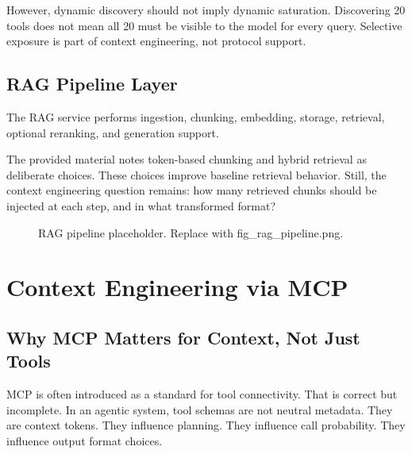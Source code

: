 \documentclass[conference]{IEEEtran}
\begin{document}
However, dynamic discovery should not imply dynamic saturation.
Discovering 20 tools does not mean all 20 must be visible to the model for every query.
Selective exposure is part of context engineering, not protocol support.

\subsection{RAG Pipeline Layer}

The RAG service performs ingestion,
chunking,
embedding,
storage,
retrieval,
optional reranking,
and generation support.

The provided material notes token-based chunking and hybrid retrieval as deliberate choices.
These choices improve baseline retrieval behavior.
Still, the context engineering question remains:
how many retrieved chunks should be injected at each step,
and in what transformed format?

\begin{figure}[H]
\centering
{}
\caption{RAG pipeline placeholder. Replace with fig\_rag\_pipeline.png.}
\label{fig:rag_pipeline}
\end{figure}

\section{Context Engineering via MCP}
\label{sec:core}

\subsection{Why MCP Matters for Context, Not Just Tools}

MCP is often introduced as a standard for tool connectivity.
That is correct but incomplete.
In an agentic system, tool schemas are not neutral metadata.
They are context tokens.
They influence planning.
They influence call probability.
They influence output format choices.
\end{document}

